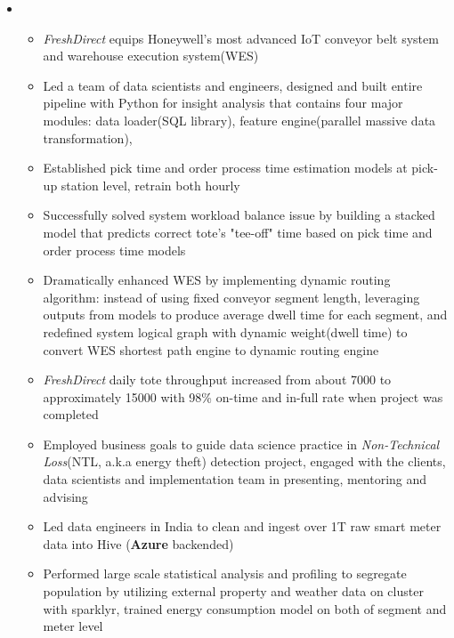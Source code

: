 \documentclass[11pt,a4paper,sans]{moderncv}        %
\begin{document}
\begin{itemize}
	\item{
		{\vspace{3pt}
			\begin{itemize}
				\item \emph{FreshDirect} equips Honeywell's most advanced IoT conveyor belt system and warehouse execution system(WES)
				\item Led a team of data scientists and engineers, designed and built entire pipeline with Python for insight analysis that contains four major modules: data loader(SQL library), feature engine(parallel massive data transformation), 
				\item Established pick time and order process time estimation models at pick-up station level, retrain both hourly
				\item Successfully solved system workload balance issue by building a stacked model that predicts correct tote's "tee-off" time based on pick time and order process time models
				\item Dramatically enhanced WES by implementing dynamic routing algorithm: instead of using fixed conveyor segment length, leveraging outputs from models to produce average dwell time for each segment, and  redefined system logical graph with dynamic weight(dwell time) to convert WES shortest path engine to dynamic routing engine
				\item \emph{FreshDirect} daily tote throughput increased from about 7000 to approximately 15000 with 98\% on-time and in-full rate when project was completed
				\item Employed business goals to guide data science practice in \emph{Non-Technical Loss}(NTL, a.k.a energy theft) detection project, engaged with the clients, data scientists and implementation team in presenting, mentoring and advising 
				\item Led data engineers in India to clean and ingest over 1T raw smart meter data into Hive (\textbf{Azure} backended)
				\item Performed large scale statistical analysis and profiling to segregate population by utilizing external property and weather data on cluster with sparklyr, trained energy consumption model on both of segment and meter level

\end{itemize}}}
\end{itemize}
\end{document}
